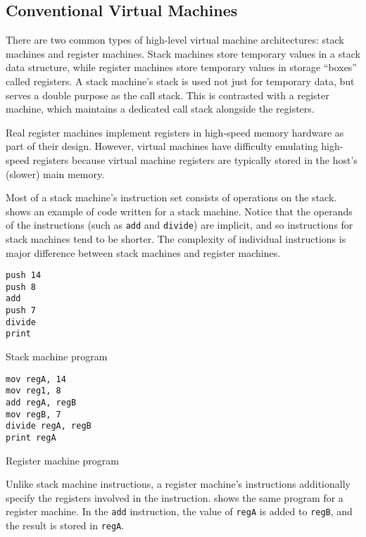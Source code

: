 		\subsection{Conventional Virtual Machines}
			There are two common types of high-level virtual machine architectures: stack machines and register machines. Stack machines store temporary values in a stack data structure, while register machines store temporary values in storage ``boxes'' called registers. A stack machine's stack is used not just for temporary data, but serves a double purpose as the call stack. This is contrasted with a register machine, which maintains a dedicated call stack alongside the registers.
			
			Real register machines implement registers in high-speed memory hardware as part of their design. However, virtual machines have difficulty emulating high-speed registers because virtual machine registers are typically stored in the host's (slower) main memory.
			
			Most of a stack machine's instruction set consists of operations on the stack.  shows an example of code written for a stack machine. Notice that the operands of the instructions (such as \texttt{add} and \texttt{divide}) are implicit, and so instructions for stack machines tend to be shorter. The complexity of individual instructions is major difference between stack machines and register machines. 
		
			\begin{doublefig}
				\begin{halffig}
					\begin{lstlisting}
push 14
push 8
add
push 7
divide
print
					\end{lstlisting}
					\caption{Stack machine program}
					\label{fig:stackprogram}
				\end{halffig}
				\begin{halffig}
					\begin{lstlisting}
mov regA, 14
mov reg1, 8
add regA, regB
mov regB, 7
divide regA, regB
print regA
					\end{lstlisting}
					\caption{Register machine program}
					\label{fig:registerprogram}
				\end{halffig}
			\end{doublefig}
			
			Unlike stack machine instructions, a register machine's instructions additionally specify the registers involved in the instruction.  shows the same program for a register machine. In the \texttt{add} instruction, the value of \texttt{regA} is added to \texttt{regB}, and the result is stored in \texttt{regA}.
		
